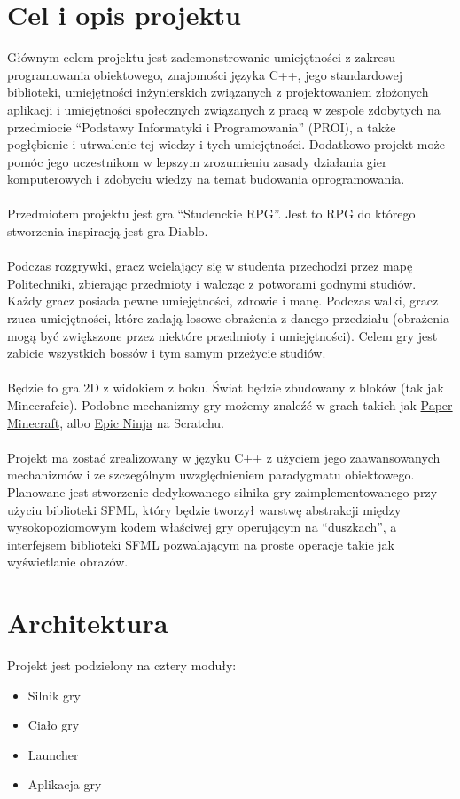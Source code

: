 \documentclass[12pt, titlepage]{article}
\begin{document}
\section{Cel i opis projektu}
Głównym celem projektu jest zademonstrowanie
umiejętności z zakresu programowania
obiektowego, znajomości języka C++,
jego standardowej biblioteki, umiejętności
inżynierskich związanych z projektowaniem
złożonych aplikacji i umiejętności społecznych
związanych z pracą w zespole zdobytych na
przedmiocie "`Podstawy Informatyki i Programowania"'
(PROI), a także pogłębienie i utrwalenie
tej wiedzy i tych umiejętności.
Dodatkowo projekt może pomóc jego uczestnikom w
lepszym zrozumieniu zasady działania gier
komputerowych i zdobyciu wiedzy na temat budowania
oprogramowania.
\\~\\
Przedmiotem projektu jest gra "`Studenckie RPG"'.
Jest to RPG do którego stworzenia inspiracją
jest gra Diablo.
\\~\\
Podczas rozgrywki, gracz
wcielający się w studenta przechodzi
przez mapę Politechniki, zbierając przedmioty i
walcząc z potworami godnymi studiów. Każdy gracz
posiada pewne umiejętności, zdrowie i manę.
Podczas walki, gracz rzuca umiejętności, które
zadają losowe obrażenia z danego przedziału
(obrażenia mogą być zwiększone przez niektóre
przedmioty i umiejętności). Celem gry jest zabicie
wszystkich bossów i tym samym przeżycie studiów.
\\~\\
Będzie to gra 2D z widokiem z boku. Świat będzie
zbudowany z bloków (tak jak Minecrafcie). Podobne
mechanizmy gry możemy znaleźć w grach takich jak
\href{https://scratch.mit.edu/projects/10128407/}{Paper Minecraft},
albo \href{https://scratch.mit.edu/projects/21554369/}{Epic Ninja} na Scratchu.
\\~\\
Projekt ma zostać zrealizowany w języku C++ z użyciem
jego zaawansowanych mechanizmów i ze szczególnym
uwzględnieniem paradygmatu obiektowego. Planowane
jest stworzenie dedykowanego silnika gry
zaimplementowanego przy użyciu biblioteki SFML, który
będzie tworzył warstwę abstrakcji między wysokopoziomowym
kodem właściwej gry operującym na "`duszkach"', a
interfejsem biblioteki SFML pozwalającym na
proste operacje takie jak wyświetlanie obrazów.

\newpage
\section{Architektura}
Projekt jest podzielony na cztery moduły:
\begin{itemize}
	\item Silnik gry
	\item Ciało gry
	\item Launcher
	\item Aplikacja gry
\end{itemize}
\end{document}
